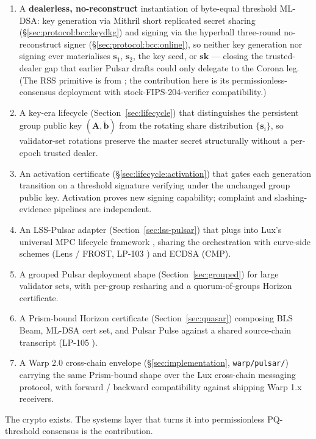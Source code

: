 \begin{enumerate}[leftmargin=2em,nosep]
  \item A \textbf{dealerless, no-reconstruct} instantiation of byte-equal threshold ML-DSA: key generation via Mithril short replicated secret sharing \cite{mithril2026} (\S\ref{sec:protocol:bcc:keydkg}) and signing via the hyperball three-round no-reconstruct signer (\S\ref{sec:protocol:bcc:online}), so neither key generation nor signing ever materialises $\mathbf{s}_1$, $\mathbf{s}_2$, the key seed, or $\mathbf{sk}$ --- closing the trusted-dealer gap that earlier Pulsar drafts could only delegate to the Corona leg. (The RSS primitive is from \cite{mithril2026}; the contribution here is its permissionless-consensus deployment with stock-FIPS-204-verifier compatibility.)
  \item A key-era lifecycle (Section~\ref{sec:lifecycle}) that distinguishes the persistent group public key $(\mathbf{A}, \tilde{\mathbf{b}})$ from the rotating share distribution $\{\mathbf{s}_i\}$, so validator-set rotations preserve the master secret structurally without a per-epoch trusted dealer.
  \item An activation certificate (\S\ref{sec:lifecycle:activation}) that gates each generation transition on a threshold signature verifying under the unchanged group public key. Activation proves new signing capability; complaint and slashing-evidence pipelines are independent.
  \item An LSS-Pulsar adapter (Section~\ref{sec:lss-pulsar}) that plugs into Lux's universal MPC lifecycle framework \cite{luxlssmpc,lp077}, sharing the orchestration with curve-side schemes (Lens / FROST, LP-103 \cite{lp103}) and ECDSA (CMP).
  \item A grouped Pulsar deployment shape (Section~\ref{sec:grouped}) for large validator sets, with per-group resharing and a quorum-of-groups Horizon certificate.
  \item A Prism-bound Horizon certificate (Section~\ref{sec:quasar}) composing BLS Beam, ML-DSA cert set, and Pulsar Pulse against a shared source-chain transcript (LP-105 \cite{lp105}).
  \item A Warp 2.0 cross-chain envelope (\S\ref{sec:implementation}, \texttt{warp/pulsar/}) carrying the same Prism-bound shape over the Lux cross-chain messaging protocol, with forward / backward compatibility against shipping Warp 1.x receivers.
\end{enumerate}

The crypto exists. The systems layer that turns it into permissionless PQ-threshold consensus is the contribution.

